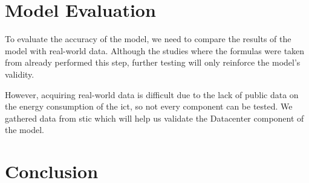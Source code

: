 \section{Model Evaluation}

    To evaluate the accuracy of the model, we need to compare the results of the model with real-world data. Although the studies where the formulas were taken from already performed this step, further testing will only reinforce the model's validity.

    However, acquiring real-world data is difficult due to the lack of public data on the energy consumption of the \ac{ict}, so not every component can be tested. We gathered data from \ac{stic} which will help us validate the Datacenter component of the model. 


\section{Conclusion}







